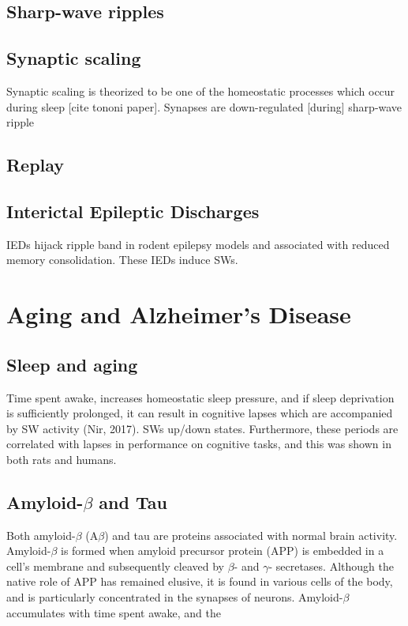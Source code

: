 \subsection*{Sharp-wave ripples}

\subsection*{Synaptic scaling}
Synaptic scaling is theorized to be one of the homeostatic processes which occur during sleep [cite tononi paper]. Synapses are down-regulated [during] sharp-wave ripple 

\subsection*{Replay}

\subsection*{Interictal Epileptic Discharges}
IEDs hijack ripple band in rodent epilepsy models and associated with reduced memory consolidation. These IEDs induce SWs.

\section*{Aging and Alzheimer's Disease}
\subsection*{Sleep and aging}
Time spent awake, increases homeostatic sleep pressure, and if sleep deprivation is sufficiently prolonged, it can result in cognitive lapses which are accompanied by SW activity (Nir, 2017). SWs up/down states. Furthermore, these periods are correlated with lapses in performance on cognitive tasks, and this was shown in both rats and humans. 

\subsection*{Amyloid-$\beta$ and Tau}
Both amyloid-$\beta$ (A$\beta$) and tau are proteins associated with normal brain activity. Amyloid-$\beta$ is formed when amyloid precursor protein (APP) is embedded in a cell's membrane and subsequently cleaved by $\beta$- and $\gamma$- secretases. Although the native role of APP has remained elusive, it is found in various cells of the body, and is particularly concentrated in the synapses of neurons. Amyloid-$\beta$ accumulates with time spent awake, and the 

